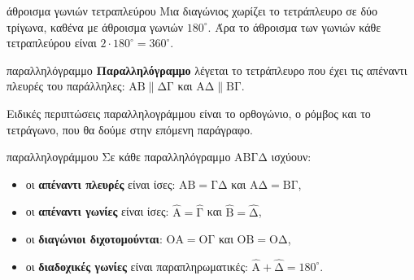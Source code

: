 \begin{center}
\end{center}

\begin{kanonas}{άθροισμα γωνιών τετραπλεύρου}
Μια διαγώνιος χωρίζει το τετράπλευρο σε δύο τρίγωνα, καθένα με άθροισμα γωνιών $180^\circ$. Άρα το άθροισμα των γωνιών κάθε τετραπλεύρου είναι $2\cdot180^\circ=360^\circ$.
\end{kanonas}

\begin{orismos}{παραλληλόγραμμο}
\textbf{Παραλληλόγραμμο} λέγεται το τετράπλευρο που έχει τις απέναντι πλευρές του παράλληλες: $\mathrm{ΑΒ}\parallel\mathrm{ΔΓ}$ και $\mathrm{ΑΔ}\parallel\mathrm{ΒΓ}$.
\end{orismos}

Ειδικές περιπτώσεις παραλληλογράμμου είναι το ορθογώνιο, ο ρόμβος και το τετράγωνο, που θα δούμε στην επόμενη παράγραφο.

\begin{center}
\end{center}

\begin{idiotita}{παραλληλογράμμου}
Σε κάθε παραλληλόγραμμο $\mathrm{ΑΒΓΔ}$ ισχύουν:
\begin{itemize}[leftmargin=1.2em,itemsep=0.3ex,topsep=2pt]
\item οι \textbf{απέναντι πλευρές} είναι ίσες: $\mathrm{ΑΒ}=\mathrm{ΓΔ}$ και $\mathrm{ΑΔ}=\mathrm{ΒΓ}$,
\item οι \textbf{απέναντι γωνίες} είναι ίσες: $\hat{\mathrm{Α}}=\hat{\mathrm{Γ}}$ και $\hat{\mathrm{Β}}=\hat{\mathrm{Δ}}$,
\item οι \textbf{διαγώνιοι διχοτομούνται}: $\mathrm{ΟΑ}=\mathrm{ΟΓ}$ και $\mathrm{ΟΒ}=\mathrm{ΟΔ}$,
\item οι \textbf{διαδοχικές γωνίες} είναι παραπληρωματικές: $\hat{\mathrm{Α}}+\hat{\mathrm{Δ}}=180^\circ$.
\end{itemize}
\end{idiotita}

